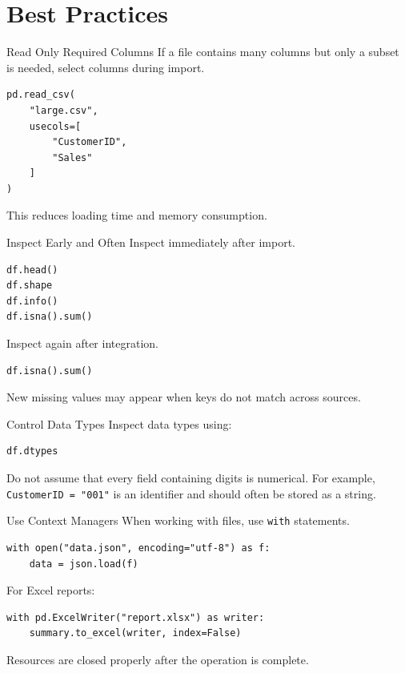 \documentclass[aspectratio=169,11pt]{beamer}
\newcommand{\code}[1]{\texttt{#1}}
\begin{document}
\section{Best Practices}

\begin{frame}[fragile]{Read Only Required Columns}
If a file contains many columns but only a subset is needed, select columns during import.

\begin{lstlisting}[style=pythonstyle]
pd.read_csv(
    "large.csv",
    usecols=[
        "CustomerID",
        "Sales"
    ]
)
\end{lstlisting}

This reduces loading time and memory consumption.
\end{frame}

\begin{frame}[fragile]{Inspect Early and Often}
Inspect immediately after import.
\begin{lstlisting}[style=pythonstyle]
df.head()
df.shape
df.info()
df.isna().sum()
\end{lstlisting}

Inspect again after integration.
\begin{lstlisting}[style=pythonstyle]
df.isna().sum()
\end{lstlisting}

New missing values may appear when keys do not match across sources.
\end{frame}

\begin{frame}[fragile]{Control Data Types}
Inspect data types using:
\begin{lstlisting}[style=pythonstyle]
df.dtypes
\end{lstlisting}

Do not assume that every field containing digits is numerical. For example, \code{CustomerID = "001"} is an identifier and should often be stored as a string.
\end{frame}

\begin{frame}[fragile]{Use Context Managers}
When working with files, use \code{with} statements.

\begin{lstlisting}[style=pythonstyle]
with open("data.json", encoding="utf-8") as f:
    data = json.load(f)
\end{lstlisting}

For Excel reports:
\begin{lstlisting}[style=pythonstyle]
with pd.ExcelWriter("report.xlsx") as writer:
    summary.to_excel(writer, index=False)
\end{lstlisting}

Resources are closed properly after the operation is complete.
\end{frame}
\end{document}
